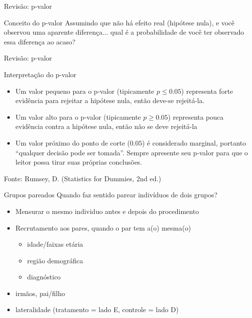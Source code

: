 \documentclass{beamer}
\begin{document}
\begin{frame}{Revisão: p-valor}
  \begin{block}{Conceito do p-valor}
    Assumindo que não há efeito real (hipótese nula), e você observou uma aparente diferença... qual é a probabilidade de você ter observado essa diferença ao acaso?
  \end{block}
\end{frame}

\begin{frame}{Revisão: p-valor}
\begin{block}{Interpretação do p-valor}
  \begin{itemize}
  \item Um valor pequeno para o p-valor (tipicamente $p \le 0.05$)
    representa forte evidência para rejeitar a hipótese nula, então
    deve-se rejeitá-la.
  \item Um valor alto para o p-valor (tipicamente $p \ge 0.05$)
    representa pouca evidência contra a hipótese nula, então não se
    deve rejeitá-la
  \item Um valor próximo do ponto de corte ($0.05$) é considerado
    marginal, portanto ``qualquer decisão pode ser tomada''. Sempre
    apresente seu p-valor para que o leitor possa tirar suas próprias
    conclusões.
  \end{itemize}
\end{block}
Fonte: Rumsey, D. (Statistics for Dummies, 2nd ed.)
\end{frame}

\begin{frame}{Grupos pareados}
Quando faz sentido parear indivíduos de dois grupos?
  \begin{itemize}
  \item Mensurar o \alert{mesmo} individuo antes e depois do procedimento
  \item Recrutamento aos pares, quando o par tem a(o) mesma(o)
    \begin{itemize}
    \item idade/faixas etária
    \item região demográfica
    \item diagnóstico
    \end{itemize}
  \item irmãos, pai/filho
  \item lateralidade (tratamento = lado E, controle = lado D)
  \end{itemize}
\end{frame}
\end{document}
